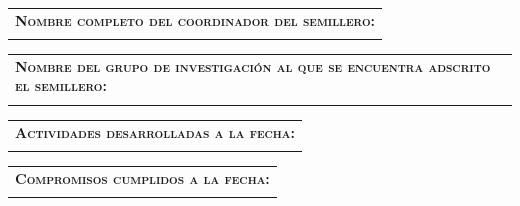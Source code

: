 \documentclass[12pt]{report}
\begin{document}
\begin{minipage}{\textwidth}
	\begin{tabular}{l}
		\begin{minipage}[t]{\textwidth}%
			\cellcolor{blue!10}\textsc{\textbf{Nombre completo del coordinador del semillero:}}
		\end{minipage}
		\vspace{0.1cm}\\
		\begin{minipage}[t]{\textwidth}%
			\cellcolor{white!10}{ coord-proy } %
		\end{minipage}
	\end{tabular}	
\end{minipage}

\begin{minipage}{\textwidth}
	\begin{tabular}{l}
		\begin{minipage}[t]{\textwidth}%
			\cellcolor{blue!10}\textsc{\textbf{Nombre del grupo de investigación al que se encuentra adscrito el semillero:}}
		\end{minipage}
		\vspace{0.1cm}\\
		\begin{minipage}[t]{\textwidth}%
			\cellcolor{white!10}{ gru-proy } %
		\end{minipage}
	\end{tabular}	
\end{minipage}

\vspace{0.3 cm}

\begin{minipage}{\textwidth}
	\begin{tabular}{l}
		\begin{minipage}[t]{\textwidth}%
			\cellcolor{blue!10}\textsc{\textbf{Actividades desarrolladas a la fecha:}}
		\end{minipage}
		\vspace{0.1cm}\\
		\begin{minipage}[t]{\textwidth}%
			\cellcolor{white!10}{ act-des-proy }
		\end{minipage}
	\end{tabular}	
\end{minipage}

\vspace{0.3 cm}

\begin{minipage}{\textwidth}
	\begin{tabular}{l}
		\begin{minipage}[t]{\textwidth}%
			\cellcolor{blue!10}\textsc{\textbf{Compromisos cumplidos a la fecha:}}
		\end{minipage}
		\vspace{0.1cm}\\
		\begin{minipage}[t]{\textwidth}%
			\cellcolor{white!10}{ act-cum-proy }
		\end{minipage}
	\end{tabular}	
\end{minipage}
\end{document}
